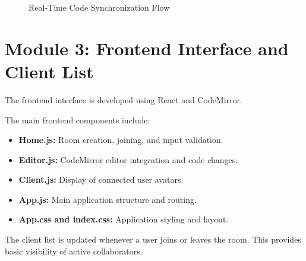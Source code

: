 \documentclass[12pt,a4paper,oneside]{report}
\begin{document}
\begin{figure}[H]
\centering


\caption{Real-Time Code Synchronization Flow}
\label{fig:syncflow}

\end{figure}

\section{Module 3: Frontend Interface and Client List}

The frontend interface is developed using React and CodeMirror.

The main frontend components include:

\begin{itemize}
    \item \textbf{Home.js:} Room creation, joining, and input validation.
    \item \textbf{Editor.js:} CodeMirror editor integration and code changes.
    \item \textbf{Client.js:} Display of connected user avatars.
    \item \textbf{App.js:} Main application structure and routing.
    \item \textbf{App.css and index.css:} Application styling and layout.
\end{itemize}

The client list is updated whenever a user joins or leaves the room. This provides basic visibility of active collaborators.
\end{document}
